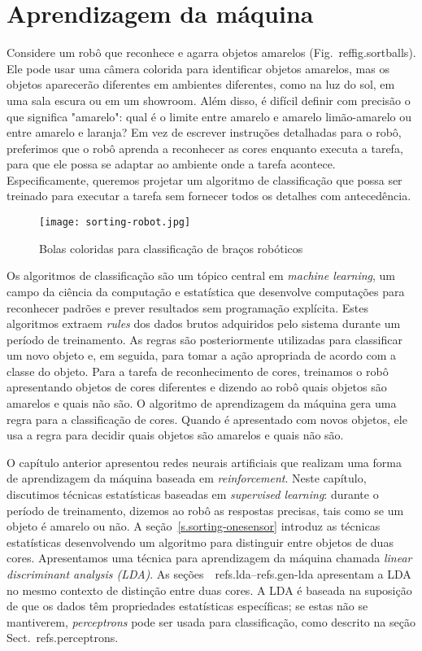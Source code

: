 
\chapter{Aprendizagem da máquina}\label{ch.machine}

Considere um robô que reconhece e agarra objetos amarelos (Fig.~ref{fig.sortballs}). Ele pode usar uma câmera colorida para identificar objetos amarelos, mas os objetos aparecerão diferentes em ambientes diferentes, como na luz do sol, em uma sala escura ou em um showroom. Além disso, é difícil definir com precisão o que significa "amarelo": qual é o limite entre amarelo e amarelo limão-amarelo ou entre amarelo e laranja? Em vez de escrever instruções detalhadas para o robô, preferimos que o robô aprenda a reconhecer as cores enquanto executa a tarefa, para que ele possa se adaptar ao ambiente onde a tarefa acontece. Especificamente, queremos projetar um algoritmo de {classificação} que possa ser {treinado} para executar a tarefa sem fornecer todos os detalhes com antecedência.

\begin{figure}
\begin{center}
\texttt{[image: sorting-robot.jpg]}
\end{center}
\caption{Bolas coloridas para classificação de braços robóticos}\label{fig.sortballs}
\end{figure}

Os algoritmos de classificação são um tópico central em \emph{machine learning}, um campo da ciência da computação e estatística que desenvolve computações para reconhecer padrões e prever resultados sem programação explícita. Estes algoritmos extraem \emph{rules} dos dados brutos adquiridos pelo sistema durante um período de treinamento. As regras são posteriormente utilizadas para classificar um novo objeto e, em seguida, para tomar a ação apropriada de acordo com a classe do objeto. Para a tarefa de reconhecimento de cores, treinamos o robô apresentando objetos de cores diferentes e dizendo ao robô quais objetos são amarelos e quais não são. O algoritmo de aprendizagem da máquina gera uma regra para a classificação de cores. Quando é apresentado com novos objetos, ele usa a regra para decidir quais objetos são amarelos e quais não são.

O capítulo anterior apresentou redes neurais artificiais que realizam uma forma de aprendizagem da máquina baseada em \emph{reinforcement}. Neste capítulo, discutimos técnicas estatísticas baseadas em \emph{supervised learning}: durante o período de treinamento, dizemos ao robô as respostas precisas, tais como se um objeto é amarelo ou não. A seção~\ref{s.sorting-onesensor} introduz as técnicas estatísticas desenvolvendo um algoritmo para distinguir entre objetos de duas cores. Apresentamos uma técnica para aprendizagem da máquina chamada \emph{linear discriminant analysis (LDA)}. As seções~~ref{s.lda}--ref{s.gen-lda} apresentam a LDA no mesmo contexto de distinção entre duas cores. A LDA é baseada na suposição de que os dados têm propriedades estatísticas específicas; se estas não se mantiverem, \emph{perceptrons} pode ser usada para classificação, como descrito na seção Sect.~ref{s.perceptrons}.


